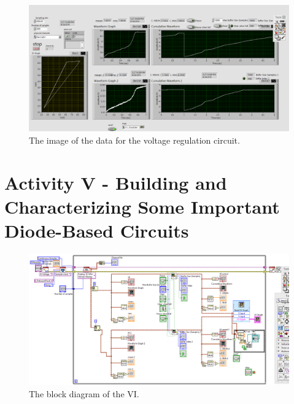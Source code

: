 \documentclass[11pt]{article}
\begin{document}
\begin{figure}[H]
 \begin{center}
  \includegraphics[width=\linewidth/1]{act3vv}
  \caption{The image of the data for the voltage regulation circuit.}
  \label{fig:act3vv}
 \end{center}
\end{figure}

\section{Activity V - Building and Characterizing Some Important Diode-Based Circuits}

\begin{figure}[H]
 \begin{center}
  \includegraphics[width=\linewidth/1]{act5bp}
  \caption{The block diagram of the VI.}
  \label{fig:act3bp}
 \end{center}
\end{figure}
\end{document}
